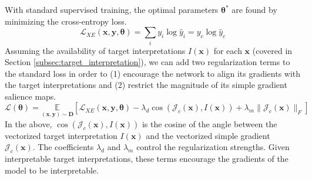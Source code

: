 With standard supervised training, the optimal parameters $\bm \theta^*$ are found by minimizing the cross-entropy loss. 
\begin{equation} \label{eq:XE-loss}
\mathcal{L}_{XE}(\bm x, \bm y, \bm \theta) =  \sum_{i} y_i \log \hat{y}_i 
= y_{c} \log \hat{y}_{c}
\end{equation}
Assuming the availability of target interpretations $I(\bm x)$ for each $\bm{x}$ (covered in Section \ref{subsec:target_interpretation}), we can add two regularization terms to the standard loss in order to (1) encourage the network to align its gradients with the target interpretations and (2) restrict the magnitude of its simple gradient salience maps.
\begin{equation} \label{eq:proposed-loss}
    \mathcal{L}(\bm{\theta}) = \underset{(\bm{x},\bm{y}) \sim \mathbf{D}} {\mathbb{E}} 
\left[  
\mathcal{L}_{XE}(\bm{x},\bm{y}, \bm{\theta}) - 
\lambda_d \cos(\mathcal{J}_c (\bm x), I(\bm x)) + 
\lambda_m \| \mathcal{J}_c (\bm x) \|_F \right]
\end{equation}
In the above, $\cos(\mathcal{J}_c (\bm x), I(\bm x))$ is the cosine of the angle between the vectorized target interpretation $I(\bm{x})$ and the vectorized simple gradient $\mathcal{J}_{c}(\bm{x})$. The
coefficients $\lambda_d$ and $\lambda_m$ control the regularization strengths.
Given interpretable target interpretations, these terms encourage the gradients of the model to be interpretable. %


